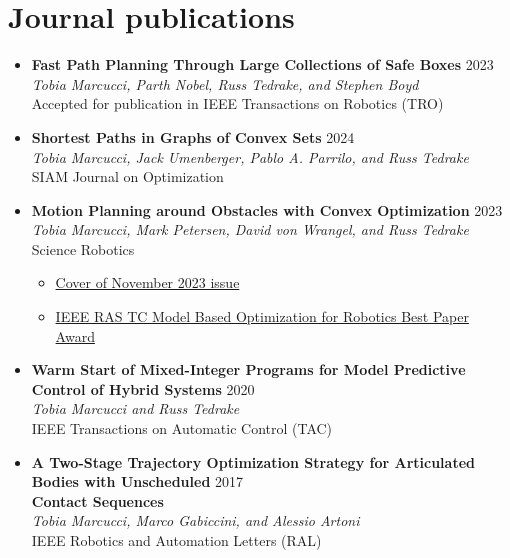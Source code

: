 \documentclass[11pt,a4paper,sans]{moderncv}
\begin{document}
\section{Journal publications}

\vspace{5pt}

\begin{itemize}
	
\item \textbf{Fast Path Planning Through Large Collections of Safe Boxes} \hfill 2023 \\
\textit{Tobia Marcucci, Parth Nobel, Russ Tedrake, and Stephen Boyd} \\
Accepted for publication in IEEE Transactions on Robotics (TRO)

\item \textbf{Shortest Paths in Graphs of Convex Sets} \hfill 2024 \\
\textit{Tobia Marcucci, Jack Umenberger, Pablo A. Parrilo, and Russ Tedrake} \\
SIAM Journal on Optimization

\item \textbf{Motion Planning around Obstacles with Convex Optimization} \hfill 2023 \\
\textit{Tobia Marcucci, Mark Petersen, David von Wrangel, and Russ Tedrake} \\
Science Robotics
\begin{itemize}
\item \href{https://www.science.org/toc/scirobotics/8/84}{\color{cyan}Cover of November 2023 issue}
\item \href{https://www.tcoptrob.org/news/2024-06-12-best-paper/}{\color{cyan}IEEE RAS TC Model Based Optimization for Robotics Best Paper Award}
\end{itemize} 

\item \textbf{Warm Start of Mixed-Integer Programs for Model Predictive Control of Hybrid Systems} \hfill 2020 \\
\textit{Tobia Marcucci and Russ Tedrake} \\
IEEE Transactions on Automatic Control (TAC)

\item \textbf{A Two-Stage Trajectory Optimization Strategy for Articulated Bodies with Unscheduled} \hfill 2017 \\
\textbf{Contact Sequences} \\
\textit{Tobia Marcucci, Marco Gabiccini, and Alessio Artoni} \\
IEEE Robotics and Automation Letters (RAL)

\end{itemize}
\end{document}
